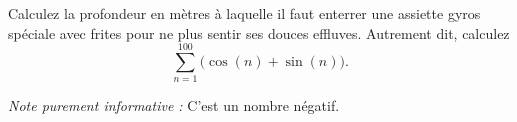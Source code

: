 \begin{exercice}\label{exoLCexoMatlab0003}

Calculez la profondeur en mètres à laquelle il faut enterrer une assiette gyros spéciale avec frites pour ne plus sentir ses douces effluves. Autrement dit, calculez
\begin{equation*}
       \sum_{n=1}^{100}  \bigl( \cos(n)+\sin(n) \bigr).
\end{equation*}

\emph{Note purement informative :} C'est un nombre négatif.


\end{exercice}

